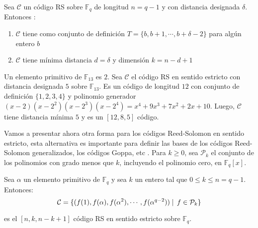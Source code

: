 \begin{theorem}
Sea $\mathcal{C}$ un código RS sobre $\mathbb{F}_q$ de longitud $n = q-1$ y con distancia designada $\delta$. Entonces :
\begin{enumerate}
	\item $\mathcal{C}$ tiene como conjunto de definición $T = \{ b, b+1,\cdots, b+\delta-2 \}$ para algún entero $b$
	\item $\mathcal{C}$ tiene mínima distancia $ d = \delta$ y dimensión $k = n-d+1$
\end{enumerate}
\end{theorem}

\begin{exampleth}
Un elemento primitivo de $\mathbb{F}_{13}$ es $2$. Sea $\mathcal{C}$ el código RS en sentido estricto con distancia designada $5$ sobre $\mathbb{F}_{13}$. Es un código de longitud $12$ con conjunto de definición $\{ 1,2,3,4 \}$ y polinomio generador $(x-2)(x-2^2)(x-2^3)(x-2^4) = x^4+9x^3+7x^2+2x+10$. Luego, $\mathcal{C}$ tiene distancia mínima $5$ y es un $[12,8,5]$ código.
\end{exampleth}

Vamos a presentar ahora otra forma para los códigos Reed-Solomon en sentido estricto, esta alternativa es importante para definir las bases de los códigos Reed-Solomon generalizados, los códigos Goppa, etc . Para $k \geq 0$, sea $\mathcal{P}_k$ el conjunto de los polinomios con grado menos que $k$, incluyendo el polinomio cero, en $\mathbb{F}_q[x]$.


\begin{theorem}
Sea $\alpha$ un elemento primitivo de $\mathbb{F}_q$ y sea $k$ un entero tal que $ 0 \leq k \leq n = q-1$. Entonces:
\[
\mathcal{C} = \{ (f(1),f(\alpha),f(\alpha^2),\cdots,f(\alpha^{q-2})) \mid \thinspace f \in \mathcal{P}_k \}
 \]

es el $[n,k,n-k+1]$ código RS en sentido estricto sobre $\mathbb{F}_q$.
\end{theorem}

